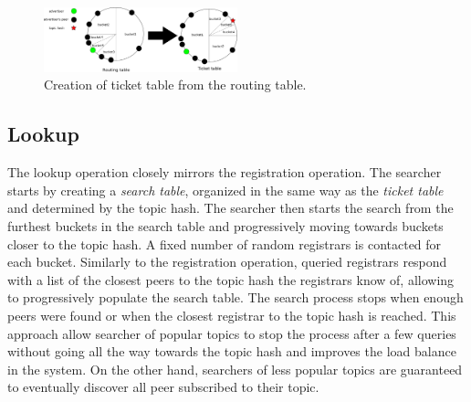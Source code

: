 \begin{figure}
    \includegraphics[width=0.5\textwidth]{img/ticket_table}
    \caption{Creation of ticket table from the routing table.}
    \label{fig:ticket_table}
\end{figure}

\subsection{Lookup}
The lookup operation closely mirrors the registration operation. The searcher starts by creating a \emph{search table}, organized in the same way as the \emph{ticket table} and determined by the topic hash. The searcher then starts the search from the furthest buckets in the search table and progressively moving towards buckets closer to the topic hash. A fixed number of random registrars is contacted for each bucket. Similarly to the registration operation, queried registrars respond with a list of the closest peers to the topic hash the registrars know of, allowing to progressively populate the search table. The search process stops when enough peers were found or when the closest registrar to the topic hash is reached. This approach allow searcher of popular topics to stop the process after a few queries without going all the way towards the topic hash and improves the load balance in the system. On the other hand, searchers of less popular topics are guaranteed to eventually discover all peer subscribed to their topic. 

